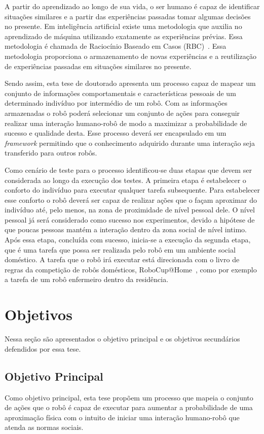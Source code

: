 A partir do aprendizado ao longo de sua vida, o ser humano é capaz de identificar situações similares e a partir das experiências passadas tomar algumas decisões no presente. Em inteligência artificial existe uma metodologia que auxilia no aprendizado de máquina utilizando exatamente as experiências prévias. Essa metodologia é chamada de Raciocínio Baseado em Casos (RBC)~\cite{lopez:2013}. Essa metodologia proporciona o armazenamento de novas experiências e a reutilização de experiências passadas em situações similares no presente.

Sendo assim, esta tese de doutorado apresenta um processo capaz de mapear um conjunto de informações comportamentais e características pessoais de um determinado indivíduo por intermédio de um robô. Com as informações armazenadas o robô poderá selecionar um conjunto de ações para conseguir realizar uma interação humano-robô de modo a maximizar a probabilidade de sucesso e qualidade desta. Esse processo deverá ser encapsulado em um \emph{framework} permitindo que o conhecimento adquirido durante uma interação seja transferido para outros robôs.

Como cenário de teste para o processo identificou-se duas etapas que devem ser considerada ao longo da execução dos testes. A primeira etapa é estabelecer o conforto do indivíduo para executar qualquer tarefa subsequente. Para estabelecer esse conforto o robô deverá ser capaz de realizar ações que o façam aproximar do indivíduo até, pelo menos, na zona de proximidade de nível pessoal dele. O nível pessoal já será considerado como sucesso nos experimentos, devido a hipótese de que poucas pessoas mantém a interação dentro da zona social de nível intimo. Após essa etapa, concluída com sucesso, inicia-se a execução da segunda etapa, que é uma tarefa que possa ser realizada pelo robô em um ambiente social doméstico. A tarefa que o robô irá executar está direcionada com o livro de regras da competição de robôs domésticos, RoboCup@Home~\cite{robocup:2015}, como por exemplo a tarefa de um robô enfermeiro dentro da residência.

\section{Objetivos}
Nessa seção são apresentados o objetivo principal e os objetivos secundários defendidos por essa tese.

\subsection{Objetivo Principal}
Como objetivo principal, esta tese propõem um processo que mapeia o conjunto de ações que o robô é capaz de executar para aumentar a probabilidade de uma aproximação física com o intuito de iniciar uma interação humano-robô que atenda as normas sociais.

